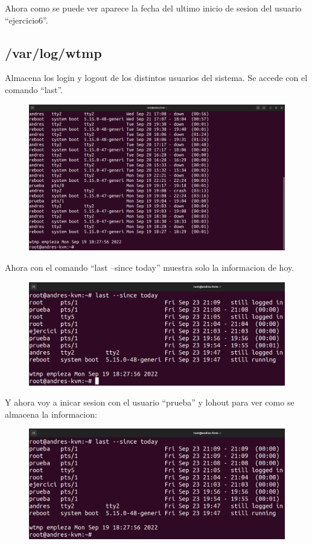 \documentclass{article}
\begin{document}
Ahora como se puede ver aparece la fecha del ultimo inicio de sesion del usuario ``ejercicio6''.

\subsection{/var/log/wtmp}
Almacena los login y logout de los distintos usuarios del sistema. Se accede con el comando ``last''. 

\begin{figure}[H]
    \includegraphics[width=\textwidth]{imagenes/lastnormal.png}
\end{figure}

Ahora con el comando ``last --since today'' muestra solo la informacion de hoy.

\begin{figure}[H]
    \includegraphics[width=\textwidth]{imagenes/lasttoday.png}
\end{figure}

Y ahora voy a inicar sesion con el usuario ``prueba'' y lohout para ver como se almacena la informacion:

\begin{figure}[H]
    \includegraphics[width=\textwidth]{imagenes/lasttodayprueba.png}
\end{figure}
\end{document}
